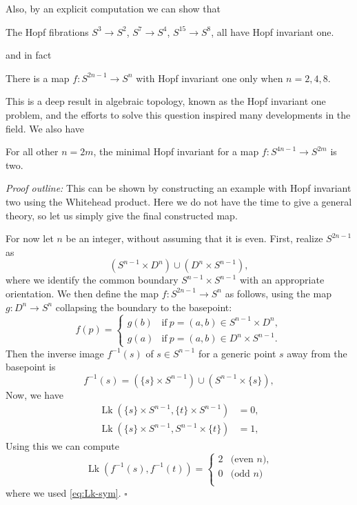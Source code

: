\documentclass[12pt]{article}
\numberwithin{equation}{section}
\numberwithin{figure}{section}
\theoremstyle{remark}
\renewenvironment{proof}{\noindent\textsl{Proof outline:}}{\hfill$\square$}
\def\Lk{\mathop{\mathrm{Lk}}}
\begin{document}
Also, by an explicit computation we can show  that \begin{proposition}
The Hopf fibrations $S^3\to S^2$, $S^7\to S^4$, $S^{15}\to S^8$,
all have Hopf invariant one.
\end{proposition}
and in fact 
\begin{theorem}
There is a map $f:S^{2n-1}\to S^n$ with Hopf invariant one
only when $n=2,4,8$.
\end{theorem}
This is a deep result in algebraic topology, known as the Hopf invariant one problem,
and the efforts to solve this question inspired many developments in the field.
We also have
\begin{proposition}
\label{prop:whitehead}
For all other $n=2m$, the minimal Hopf invariant for a map $f:S^{4n-1}\to S^{2m}$ is two.
\end{proposition}

\begin{proof}
This can be shown by constructing an example with Hopf invariant two using the Whitehead product.
Here we do not have the time to give a general theory, so let us simply give the final constructed map.

For now let $n$ be an integer, without assuming that it is even.
First, realize $S^{2n-1}$ as \begin{equation}
(S^{n-1} \times D^n) \cup (D^n \times S^{n-1}), 
\end{equation} where we identify the common boundary $S^{n-1}\times S^{n-1}$ with an appropriate orientation. 
We then define the map $f:S^{2n-1}\to S^n$ as follows,
using the map $g:D^n \to S^n$ collapsing the boundary to the basepoint:
\begin{equation}
f(p) = \begin{cases}
g(b) & \text{if}\ p=(a,b) \in S^{n-1}\times D^n ,\\
g(a) & \text{if}\ p=(a,b) \in D^{n}\times S^{n-1}.
\end{cases}
\end{equation}
Then the inverse image $f^{-1}(s)$ of $s\in S^{n-1}$ for a generic point $s$ away from the basepoint is  \begin{equation}
f^{-1}(s)= (\{s\} \times S^{n-1} ) \cup (S^{n-1} \times \{s\}),
\end{equation}
Now, we have \begin{align}
\Lk (\{s\} \times S^{n-1} ,\{t\} \times S^{n-1} )  &=0 ,\\
\Lk (\{s\} \times S^{n-1} ,S^{n-1}\times \{t\} )  &=1,
\end{align}
Using this we can compute \begin{equation}
\Lk (f^{-1}(s),f^{-1}(t)) = \begin{cases}
2 & \text{(even $n$),} \\
0 & \text{(odd $n$)} \\
\end{cases}
\end{equation}
where we used \eqref{eq:Lk-sym}.
\end{proof}
\end{document}
